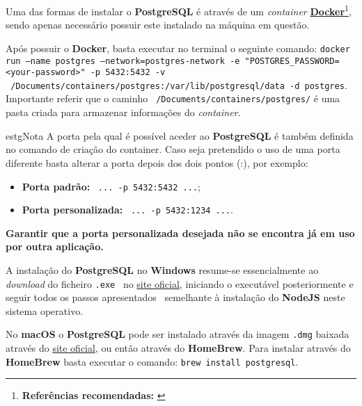 \label{postgreSQLAttachments}


Uma das formas de instalar o \textbf{PostgreSQL} é através de um \textit{container} \textbf{\href{https://www.docker.com/}{Docker}}\footnote{\textbf{Referências recomendadas:} \cite{postgresDocker,postgresContainer}}, sendo apenas necessário possuir este instalado na máquina em questão.

Após possuir o \textbf{Docker}, basta executar no terminal o seguinte comando: \texttt{docker run --name postgres --network=postgres-network -e "POSTGRES_PASSWORD=<your-password>" -p 5432:5432 -v ~/Documents/containers/postgres:/var/lib/postgresql/data -d postgres}. Importante referir que o caminho \texttt{~/Documents/containers/postgres/} é uma pasta criada para armazenar informações do \textit{container}.

\begin{mybox}{estg}{Nota}
	A porta pela qual é possível aceder ao \textbf{PostgreSQL} é também definida no comando de criação do container. Caso seja pretendido o uso de uma porta diferente basta alterar a porta depois dos dois pontos (:), por exemplo:

	\begin{itemize}
		\item \textbf{Porta padrão:} ~\texttt{... -p 5432:5432 ...};
		\item \textbf{Porta personalizada:} ~\texttt{... -p 5432:1234 ...}.
	\end{itemize}

	\hspace{15pt}

	\textbf{Garantir que a porta personalizada desejada não se encontra já em uso por outra aplicação.}
\end{mybox}


A instalação do \textbf{PostgreSQL} no \textbf{Windows} resume-se essencialmente ao \textit{download} do ficheiro \verb|.exe|~ no \href{https://www.postgresql.org/download/}{site oficial}, iniciando o executável posteriormente e seguir todos os passos apresentados {\small~semelhante à instalação do \textbf{NodeJS} neste sistema operativo}.


No \textbf{macOS} o \textbf{PostgreSQL} pode ser instalado através da imagem \verb|.dmg| baixada através do \href{https://www.postgresql.org/download/}{site oficial}, ou então através do \textbf{HomeBrew}. Para instalar através do \textbf{HomeBrew} basta executar o comando: \verb|brew install postgresql|.

